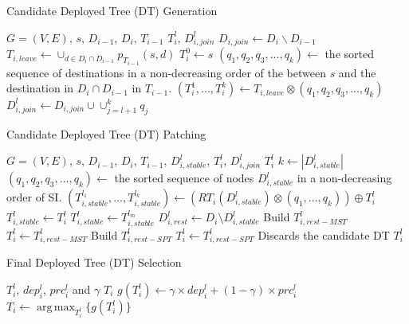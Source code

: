 \documentclass[10pt, conference, letterpaper]{IEEEtran}
\theoremstyle{definition}
\DeclareMathOperator*{\argmax}{arg\,max}
\newcounter{procedure}
\begin{document}
\begin{procedure} [h] \small
	\selectfont \caption{Candidate Deployed Tree (DT) Generation}
	\begin{algorithmic} [1]
		\REQUIRE  $G=(V,E)$, $s$, $D_{i-1}$, $D_{i}$, $T_{i-1}$
		\ENSURE  $T_{i}^{l}$, $D_{i,join}^{l}$
		\STATE  $D_{i,join}\leftarrow D_{i}\backslash D_{i-1}$
		\STATE  $T_{i,leave}\leftarrow \cup_{d\in D_{i} \cap D_{i-1}} p_{T_{i-1}}(s,d)$
		\STATE  $T_{i}^{0}\leftarrow s$
		\STATE   $(q_{1},q_{2},q_{3},...,q_{k})\leftarrow $ the sorted sequence of destinations in a non-decreasing order of the between $s$ and the destination in $D_{i} \cap D_{i-1}$ in $T_{i-1}$.
		\STATE  $(T_{i}^{1},...,T_{i}^{k})\leftarrow T_{i,leave}\otimes (q_{1},q_{2},q_{3},...,q_{k})$
		\STATE  $D_{i,join}^{l}\leftarrow D_{i,join}\cup \cup_{j=l+1}^{k} q_{j}$
	\end{algorithmic}
\end{procedure}

\begin{procedure} [h] \small
	\selectfont \caption{Candidate Deployed Tree (DT) Patching}
	\begin{algorithmic} [1]
		\REQUIRE  $G=(V,E)$, $s$, $D_{i-1}$, $D_{i}$, $T_{i-1}$, $D_{i,stable}^{l}$, $T_{i}^{l}$, $D_{i,join}^{l}$
		\ENSURE  $T_{i}^{l}$
		\STATE  $k\leftarrow |D_{i,stable}^{l}|$
		\STATE  $(q_{1},q_{2},q_{3},...,q_{k})\leftarrow$ the sorted sequence of nodes $D_{i,stable}^{l}$ in a non-decreasing order of SI.
		\STATE  $(T_{i,stable}^{l_1},...,T_{i,stable}^{l_k})\leftarrow(RT_i(D_{i,stable}^{l})\otimes(q_{1},...,q_{k}))\oplus T_{i}^{l}$
		\STATE  $T_{i,stable}^{l}\leftarrow T_{i}^{l}$
				\STATE  $T_{i,stable}^{l}\leftarrow T_{i,stable}^{l_m}$
			\ENDIF  
		\ENDFOR  
		\STATE  $D_{i,rest}^{l}\leftarrow D_{i}\setminus D_{i,stable}^{l}$
		\STATE  Build $T_{i,rest-MST}^{l}$
			\STATE  $T_{i}^{l}\leftarrow T_{i,rest-MST}^{l}$
		\ELSE  %
			\STATE  Build $T_{i,rest-SPT}^{l}$
				\STATE  $T_{i}^{l}\leftarrow T_{i,rest-SPT}^{l}$
			\ELSE  %
				\STATE  Discards the candidate DT  $T_{i}^{l}$
			\ENDIF  
		\ENDIF  
	\end{algorithmic}
\end{procedure}

\begin{procedure} [h] \small
	\selectfont \caption{Final Deployed Tree (DT) Selection}
	\begin{algorithmic} [1]
		\REQUIRE  $T_{i}^{l}$, $dep_{i}^{l}$, $prc_{i}^{l}$ and $\gamma$
		\ENSURE  $T_{i}$
		\STATE  $g(T_{i}^{l})\leftarrow\gamma\times dep_{i}^{l}+(1-\gamma)\times prc_{i}^{l}$
		\STATE  $T_{i}\leftarrow \argmax_{T_{i}^{l}}\{g(T_{i}^{l})\}$
	\end{algorithmic}
\end{procedure}
\end{document}
